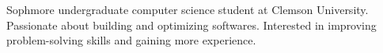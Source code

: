 

\begin{cvparagraph}

Sophmore undergraduate computer science student at Clemson University. Passionate about building and optimizing softwares. Interested in improving problem-solving skills and gaining more experience.

\end{cvparagraph}

